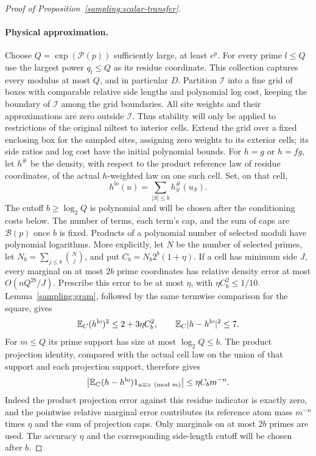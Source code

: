 \begin{proof}[Proof of Proposition~\ref{sampling:scalar-transfer}]
\paragraph{Physical approximation.}
Choose $Q=\exp(\mathcal P(p))$ sufficiently large, at least $e^p$.
For every prime $l\le Q$ use the largest power $q_l\le Q$ as its residue
coordinate.  This collection captures every modulus at most $Q$, and in
particular $D$.  Partition $\mathcal I$ into a fine grid of boxes with
comparable relative side lengths and polynomial log cost, keeping the
boundary of $\mathcal I$ among the grid boundaries.  All site weights and
their approximations are zero outside $\mathcal I$.  Thus stability will
only be applied to restrictions of the original niltest to interior cells.
Extend the grid over a fixed enclosing box for the sampled sites, assigning
zero weights to its exterior cells; its side ratios and log cost have the
initial polynomial bounds.
For $h=g$ or $h=fg$, let $h^\#$ be the density, with respect to the product
reference law of residue coordinates, of the actual $h$-weighted law on
one such cell.  Set, on that cell,
\[
 h^{\mathrm{lo}}(u)=\sum_{|S|\le b}h^\#_S(u_S).
\]
The cutoff $b\ge\log_2Q$ is polynomial and will be chosen after the
conditioning costs below.  The number of terms, each term's cap, and the
sum of caps are $\mathcal B(p)$ once $b$ is fixed.  Products of a polynomial
number of selected moduli have polynomial logarithms.  More explicitly,
let $N$ be the number of selected primes, let
$N_b=\sum_{j\le b}\binom Nj$, and put $C_b=N_b2^b(1+\eta)$.
If a cell has minimum side $J$, every marginal on at most $2b$ prime
coordinates has relative density error at most $O(nQ^{2b}/J)$.
Prescribe this error to be at most $\eta$, with
$\eta C_b^2\le1/10$.  Lemma~\ref{sampling:gram}, followed by the same
termwise comparison for the square, gives
\[
 \mathbb E_C(h^{\mathrm{lo}})^2\le2+3\eta C_b^2,
 \qquad \mathbb E_C|h-h^{\mathrm{lo}}|^2\le7.
\]
For $m\le Q$ its prime support has size at most $\log_2Q\le b$.
The product projection identity, compared with the actual cell law on
the union of that support and each projection support, therefore gives
\begin{equation}\label{sampling:cell-residue-error}
 \left|\mathbb E_C (h-h^{\mathrm{lo}})1_{u\equiv z\pmod m}\right|
 \le\eta C_bm^{-n}.
\end{equation}
Indeed the product projection error against this residue indicator is
exactly zero, and the pointwise relative marginal error contributes its
reference atom mass $m^{-n}$ times $\eta$ and the sum of projection caps.
Only marginals on at most $2b$ primes are used.  The accuracy $\eta$ and
the corresponding side-length cutoff will be chosen after $b$.


\end{proof}
